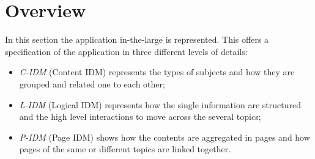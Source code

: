 \documentclass[../../DD.tex]{subfiles}
\begin{document}
\section{Overview}
	In this section the application in-the-large is represented. This offers a specification of the application in three different levels of details: 
	\begin{itemize}
		\item \textit{C-IDM} (Content IDM) represents the types of subjects and how they are grouped and related one to each other; 
		\item \textit{L-IDM} (Logical IDM) represents how the single information are structured and the high level interactions to move across the several topics;
		\item \textit{P-IDM} (Page IDM) shows how the contents are aggregated in pages and how pages of the same or different topics are linked together.
	\end{itemize}
\end{document}

